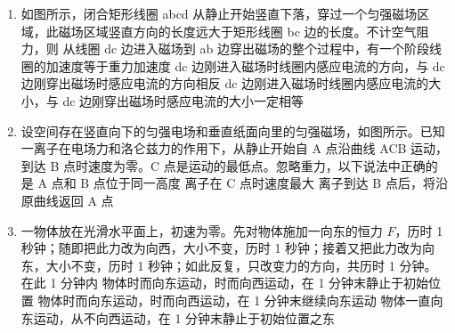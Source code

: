 \documentclass[\gkver]{gaokaozhenti}
\begin{document}
\begin{enumerate}
\item
如图所示，闭合矩形线圈 abcd 从静止开始竖直下落，穿过一个匀强磁场区域，此磁场区域竖直方向的长度远大于矩形线圈 bc 边的长度。不计空气阻力，则
\onepicture[h=4.45cm]{}
{从线圈 dc 边进入磁场到 ab 边穿出磁场的整个过程中，有一个阶段线圈的加速度等于重力加速度}
{dc 边刚进入磁场时线圈内感应电流的方向，与 dc 边刚穿出磁场时感应电流的方向相反}
{dc 边刚进入磁场时线圈内感应电流的大小，与 dc 边刚穿出磁场时感应电流的大小一定相等}


\item
设空间存在竖直向下的匀强电场和垂直纸面向里的匀强磁场，如图所示。已知一离子在电场力和洛仑兹力的作用下，从静止开始自 A 点沿曲线 ACB 运动，到达 B 点时速度为零。C 点是运动的最低点。忽略重力，以下说法中正确的是
{A 点和 B 点位于同一高度}
{离子在 C 点时速度最大}
{离子到达 B 点后，将沿原曲线返回 A 点}


\item
一物体放在光滑水平面上，初速为零。先对物体施加一向东的恒力 $F$，历时 1 秒钟；随即把此力改为向西，大小不变，历时 1 秒钟；接着又把此力改为向东，大小不变，历时 1 秒钟；如此反复，只改变力的方向，共历时 1 分钟。在此 1 分钟内
{物体时而向东运动，时而向西运动，在 1 分钟末静止于初始位置}
{物体时而向东运动，时而向西运动，在 1 分钟末继续向东运动}
{物体一直向东运动，从不向西运动，在 1 分钟末静止于初始位置之东}


\end{enumerate}
\end{document}
